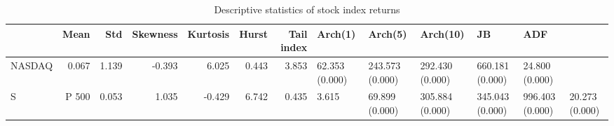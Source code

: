 \begin{table}
\caption{Descriptive statistics of stock index returns}
\label{tab:descriptive_statistics}
\begin{tabular}{lrrrrrrlllll}
\toprule
 & Mean & Std & Skewness & Kurtosis & Hurst & Tail index & Arch(1) & Arch(5) & Arch(10) & JB & ADF \\
\midrule
NASDAQ & 0.067 & 1.139 & -0.393 & 6.025 & 0.443 & 3.853 & 62.353 (0.000) & 243.573 (0.000) & 292.430 (0.000) & 660.181 (0.000) & 24.800 (0.000) \\
S&P 500 & 0.053 & 1.035 & -0.429 & 6.742 & 0.435 & 3.615 & 69.899 (0.000) & 305.884 (0.000) & 345.043 (0.000) & 996.403 (0.000) & 20.273 (0.000) \\
\bottomrule
\end{tabular}
\end{table}
